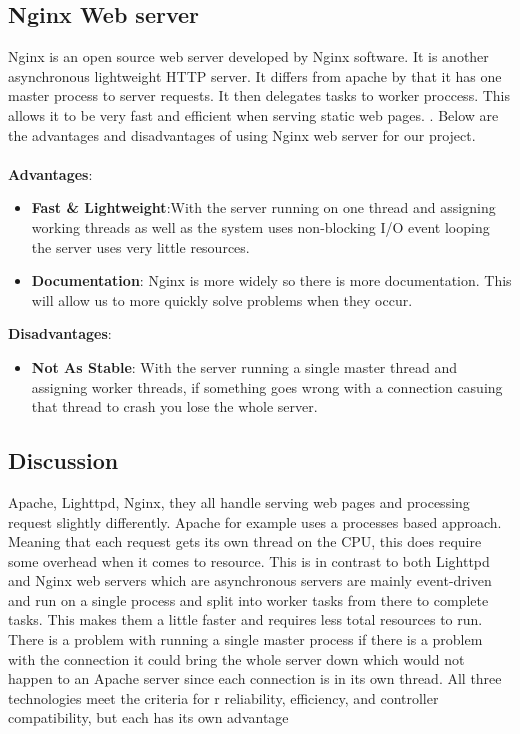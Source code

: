 \documentclass[onecolumn, draftclsnofoot,10pt, compsoc]{IEEEtran}
\begin{document}
		\subsection{Nginx Web server}
		Nginx is an open source web server developed by Nginx software. It is another
		asynchronous lightweight HTTP server. It differs from apache by that it has
		one master process to server requests. It then delegates tasks to worker
		proccess. This allows it to be very fast and efficient when serving static
		web pages. \cite{Nginx}. Below are the advantages and disadvantages
		of using Nginx web server for our project.
		\\\\
		\textbf{Advantages}:
		\begin{itemize}
			\item \textbf{Fast & Lightweight}:With the server running on one thread
			and assigning working threads as well as the system uses non-blocking I/O
			event looping the server uses very little resources.
			\item \textbf{Documentation}: Nginx is more widely so there is more documentation.
			This will allow us to more quickly solve problems when they occur.
		\end{itemize}
		\noindent\textbf{Disadvantages}:
		\begin{itemize}
			\item \textbf{Not As Stable}: With the server running a single master thread
			and assigning worker threads, if something goes wrong with a connection casuing
			that thread to crash you lose the whole server.
		\end{itemize}
		\subsection{Discussion}
	 	Apache, Lighttpd, Nginx, they all handle serving web pages and processing
		request slightly differently. Apache for example uses a processes based approach.
	 	Meaning that each request gets its own thread on the CPU, this does require
		some overhead when it comes to resource. This is in contrast to both Lighttpd
		and Nginx web servers which are asynchronous servers are mainly event-driven
		and run on a single process and split into worker tasks from there to complete
		tasks. This makes them a little faster and requires less total resources to run.
		There is a problem with running a single master process if there is a problem
		with the connection it could bring the whole server down which would not happen to an Apache server since each
		connection is in its own thread. All three technologies meet the criteria for r
		reliability, efficiency, and controller compatibility, but each has its own
		advantage
\end{document}
